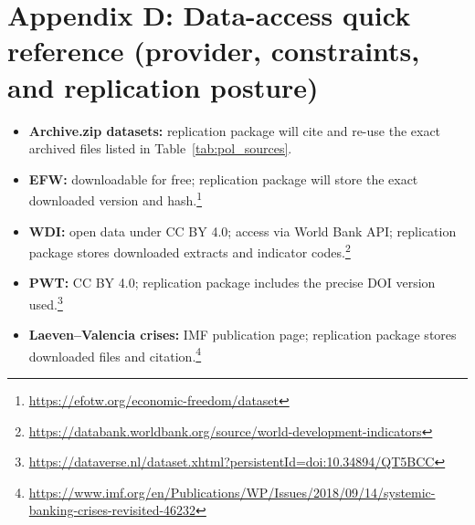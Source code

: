 \documentclass[11pt]{article}
\newcommand{\1}{\mathbf{1}}
\begin{document}
\section*{Appendix D: Data-access quick reference (provider, constraints, and replication posture)}
\begin{itemize}[leftmargin=1.2em]
\item \textbf{Archive.zip datasets:} replication package will cite and re-use the exact archived files listed in Table~\ref{tab:pol_sources}.
\item \textbf{EFW:} downloadable for free; replication package will store the exact downloaded version and hash.\footnote{\url{https://efotw.org/economic-freedom/dataset}}
\item \textbf{WDI:} open data under CC BY 4.0; access via World Bank API; replication package stores downloaded extracts and indicator codes.\footnote{\url{https://databank.worldbank.org/source/world-development-indicators}}
\item \textbf{PWT:} CC BY 4.0; replication package includes the precise DOI version used.\footnote{\url{https://dataverse.nl/dataset.xhtml?persistentId=doi:10.34894/QT5BCC}}
\item \textbf{Laeven--Valencia crises:} IMF publication page; replication package stores downloaded files and citation.\footnote{\url{https://www.imf.org/en/Publications/WP/Issues/2018/09/14/systemic-banking-crises-revisited-46232}}
\end{itemize}

\end{document}
